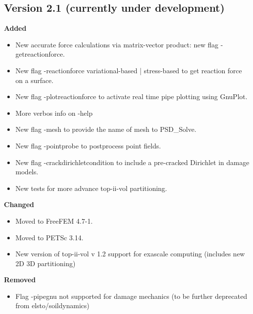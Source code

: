 \subsection{Version 2.1 (currently under development)}
\textbf{Added}
\begin{itemize}
    \item New accurate force calculations via matrix-vector product: new flag {\ttfamily -getreactionforce}.
    \item New flag {\ttfamily  -reactionforce} variational-based | stress-based to get reaction force on a surface.
    \item New flag {\ttfamily  -plotreactionforce} to activate real time pipe plotting using GnuPlot.
    \item More verbos info on {\ttfamily -help}    
    \item New flag {\ttfamily -mesh} to provide the name of mesh to {\ttfamily PSD\_Solve}.  
    \item New flag {\ttfamily -pointprobe} to postprocess point fields.
    \item New flag {\ttfamily-crackdirichletcondition} to include a pre-cracked Dirichlet in damage models.
    \item New tests for more advance top-ii-vol partitioning.     
\end{itemize}
\textbf{Changed}
\begin{itemize}
	\item Moved to FreeFEM 4.7-1.
	\item Moved to PETSc 3.14.
	\item New version of top-ii-vol v 1.2 support for exascale computing (includes new 2D 3D partitioning)
\end{itemize}
\textbf{Removed}
\begin{itemize}
    \item Flag {\ttfamily-pipegnu} not supported for damage mechanics (to be further deprecated from elsto/soildynamics) 
\end{itemize}
